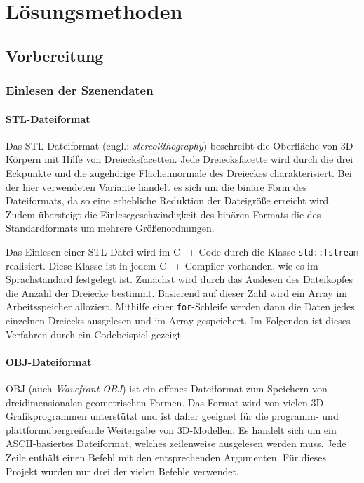 \documentclass[crop=false]{standalone}
\begin{document}
  \section{Lösungsmethoden} %
  \label{sec:loesungsmethoden}



    \subsection{Vorbereitung} %
    \label{sub:Vorbereitung}

      \subsubsection{Einlesen der Szenendaten} %
      \label{ssub:einlesen_der_daten}
        \paragraph{STL-Dateiformat}
        Das STL-Dateiformat (engl.: \textit{stereolithography}) beschreibt die Oberfläche von 3D-Körpern mit Hilfe von Dreiecksfacetten.
        Jede Dreiecksfacette wird durch die drei Eckpunkte und die zugehörige Flächennormale des Dreieckes charakterisiert.
        Bei der hier verwendeten Variante handelt es sich um die binäre Form des Dateiformats, da so eine erhebliche Reduktion der Dateigröße erreicht wird.
        Zudem übersteigt die Einlesegeschwindigkeit des binären Formats die des Standardformats um mehrere Größenordnungen.

        Das Einlesen einer STL-Datei wird im C++-Code durch die Klasse \texttt{std::fstream} realisiert.
        Diese Klasse ist in jedem C++-Compiler vorhanden, wie es im Sprachstandard festgelegt ist.
        Zunächst wird durch das Auslesen des Dateikopfes die Anzahl der Dreiecke bestimmt.
        Basierend auf dieser Zahl wird ein Array im Arbeitsspeicher alloziert.
        Mithilfe einer \texttt{for}-Schleife werden dann die Daten jedes einzelnen Dreiecks ausgelesen und im Array gespeichert.
        Im Folgenden ist dieses Verfahren durch ein Codebeispiel gezeigt.


        \paragraph{OBJ-Dateiformat}
        OBJ (auch \textit{Wavefront OBJ}) ist ein offenes Dateiformat zum Speichern von dreidimensionalen geometrischen Formen.
        Das Format wird von vielen 3D-Grafikprogrammen unterstützt und ist daher geeignet für die programm- und plattformübergreifende Weitergabe von 3D-Modellen.
        Es handelt sich um ein ASCII-basiertes Dateiformat, welches zeilenweise ausgelesen werden muss.
        Jede Zeile enthält einen Befehl mit den entsprechenden Argumenten.
        Für dieses Projekt wurden nur drei der vielen Befehle verwendet.
\end{document}
